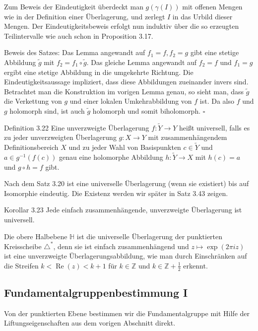 \documentclass[10pt, letterpaper]{article}
\begin{document}
Zum Beweis der Eindeutigkeit überdeckt man $g(\gamma(I))$ mit offenen Mengen wie in der Definition einer Überlagerung, und zerlegt $I$ in das Urbild dieser Mengen. Der Eindeutigkeitsbeweis erfolgt nun induktiv über die so erzeugten Teilintervalle wie auch schon in Proposition 3.17.

Beweis des Satzes: Das Lemma angewandt auf $f_{1}=f, f_{2}=g$ gibt eine stetige Abbildung $\widetilde{g}$ mit $f_{2}=f_{1} \circ \widetilde{g}$. Das gleiche Lemma angewandt auf $f_{2}=f$ und $f_{1}=g$ ergibt eine stetige Abbildung in die umgekehrte Richtung. Die Eindeutigkeitsaussage impliziert, dass diese Abbildungen zueinander invers sind. Betrachtet man die Konstruktion im vorigen Lemma genau, so sieht man, dass $\widetilde{g}$ die Verkettung von $g$ und einer lokalen Umkehrabbildung von $f$ ist. Da also $f$ und $g$ holomorph sind, ist auch $\widetilde{g}$ holomorph und somit biholomorph. $\square$

Definition 3.22 Eine unverzweigte Überlagerung $f: \widetilde{Y} \rightarrow Y$ heißt universell, falls es zu jeder unverzweigten Überlagerung $g: X \rightarrow Y$ mit zusammenhängendem Definitionsbereich $X$ und zu jeder Wahl von Basispunkten $c \in \widetilde{Y}$ und $a \in g^{-1}(f(c))$ genau eine holomorphe Abbildung $h: \widetilde{Y} \rightarrow X$ mit $h(c)=a$ und $g \circ h=f$ gibt.

Nach dem Satz 3.20 ist eine universelle Überlagerung (wenn sie existiert) bis auf Isomorphie eindeutig. Die Existenz werden wir später in Satz 3.43 zeigen.

Korollar 3.23 Jede einfach zusammenhängende, unverzweigte Überlagerung ist universell.

Die obere Halbebene $\mathbb{H}$ ist die universelle Überlagerung der punktierten Kreisscheibe $\triangle^{*}$, denn sie ist einfach zusammenhängend und $z \mapsto \exp (2 \pi i z)$ ist eine unverzweigte Überlagerungsabbildung, wie man durch Einschränken auf die Streifen $k<\operatorname{Re}(z)<k+1$ für $k \in \mathbb{Z}$ und $k \in \mathbb{Z}+\frac{1}{2}$ erkennt.


\pagebreak

\subsection {Fundamentalgruppenbestimmung I}

Von der punktierten Ebene bestimmen wir die Fundamentalgruppe mit Hilfe der Liftungseigenschaften aus dem vorigen Abschnitt direkt.
\end{document}
